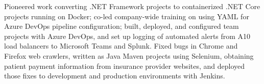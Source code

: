 {Pioneered work converting .NET Framework projects to containerized .NET Core projects running on Docker; co-led company-wide training on using YAML for Azure DevOps pipeline configuration; built, deployed, and configured team projects with Azure DevOps, and set up logging of automated alerts from A10 load balancers to Microsoft Teams and Splunk. Fixed bugs in Chrome and Firefox web crawlers, written as Java Maven projects using Selenium, obtaining patient payment information from insurance provider websites, and deployed those fixes to development and production environments with Jenkins.
}
